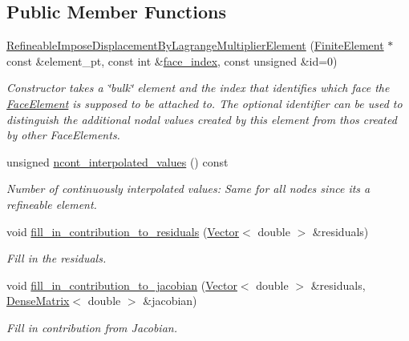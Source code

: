 \subsection*{Public Member Functions}
\begin{DoxyCompactItemize}
\item 
\hyperlink{classoomph_1_1RefineableImposeDisplacementByLagrangeMultiplierElement_aeae23b8fca961db35d855e65f414b685}{Refineable\+Impose\+Displacement\+By\+Lagrange\+Multiplier\+Element} (\hyperlink{classoomph_1_1FiniteElement}{Finite\+Element} $\ast$const \&element\+\_\+pt, const int \&\hyperlink{classoomph_1_1FaceElement_a478d577ac6db67ecc80f1f02ae3ab170}{face\+\_\+index}, const unsigned \&id=0)
\begin{DoxyCompactList}\small\item\em Constructor takes a \char`\"{}bulk\char`\"{} element and the index that identifies which face the \hyperlink{classoomph_1_1FaceElement}{Face\+Element} is supposed to be attached to. The optional identifier can be used to distinguish the additional nodal values created by this element from thos created by other Face\+Elements. \end{DoxyCompactList}\item 
unsigned \hyperlink{classoomph_1_1RefineableImposeDisplacementByLagrangeMultiplierElement_ab6d8d2ed5da8e699c290e085625d2f45}{ncont\+\_\+interpolated\+\_\+values} () const
\begin{DoxyCompactList}\small\item\em Number of continuously interpolated values\+: Same for all nodes since it\textquotesingle{}s a refineable element. \end{DoxyCompactList}\item 
void \hyperlink{classoomph_1_1RefineableImposeDisplacementByLagrangeMultiplierElement_a31ed3e9bd0d168fb2278add70062dac2}{fill\+\_\+in\+\_\+contribution\+\_\+to\+\_\+residuals} (\hyperlink{classoomph_1_1Vector}{Vector}$<$ double $>$ \&residuals)
\begin{DoxyCompactList}\small\item\em Fill in the residuals. \end{DoxyCompactList}\item 
void \hyperlink{classoomph_1_1RefineableImposeDisplacementByLagrangeMultiplierElement_af0d1b2633de720222d85e2083296a209}{fill\+\_\+in\+\_\+contribution\+\_\+to\+\_\+jacobian} (\hyperlink{classoomph_1_1Vector}{Vector}$<$ double $>$ \&residuals, \hyperlink{classoomph_1_1DenseMatrix}{Dense\+Matrix}$<$ double $>$ \&jacobian)
\begin{DoxyCompactList}\small\item\em Fill in contribution from Jacobian. \end{DoxyCompactList}\end{DoxyCompactItemize}
